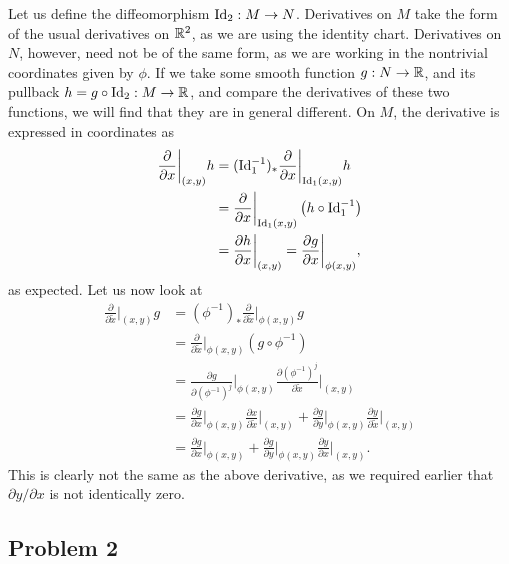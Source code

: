 \documentclass{../../mathnotes}
\begin{document}
Let us define the diffeomorphism $\operatorname{Id}_2:M\to N$. Derivatives on $M$ take the form of the usual derivatives on
$\mathbb{R}^2$, as we are using the identity chart. Derivatives on $N$, however, need not be of the same form, as we
are working in the nontrivial coordinates given by $\phi$. If we take some smooth function $g:N\to\mathbb{R}$, and its
pullback $h=g\circ\operatorname{Id}_2:M\to\mathbb{R}$, and compare the derivatives of these two functions, we will find that they are
in general different. On $M$, the derivative is expressed in coordinates as
\begin{align*}
    \frac{\partial}{\partial x}\bigg|_{(x,y)}h&=(\operatorname{Id}_1^{-1})_*\frac{\partial}{\partial x}\bigg|_{\operatorname{Id}_1(x,y)}h\\
    &=\frac{\partial}{\partial x}\bigg|_{\operatorname{Id}_1(x,y)}\left( h\circ \operatorname{Id}_1^{-1} \right)\\
    &=\frac{\partial h}{\partial x}\bigg|_{(x,y)}=\frac{\partial g}{\partial x}\bigg|_{\phi(x,y)},
\end{align*}
as expected. Let us now look at
\begin{align*}
    \frac{\partial}{\partial \tilde x}\bigg|_{(x,y)}g&=(\phi^{-1})_*\frac{\partial}{\partial \tilde x}\bigg|_{\phi(x,y)}g\\
    &=\frac{\partial}{\partial \tilde x}\bigg|_{\phi(x,y)}(g\circ\phi^{-1})\\
    &=\frac{\partial g}{\partial (\phi^{-1})^j}\bigg|_{\phi(x,y)}\frac{\partial (\phi^{-1})^j}{\partial \tilde x}\bigg|_{(x,y)}\\
    &=\frac{\partial g}{\partial x}\bigg|_{\phi(x,y)}\frac{\partial x}{\partial \tilde x}\bigg|_{(x,y)}
    +\frac{\partial g}{\partial y}\bigg|_{\phi(x,y)}\frac{\partial y}{\partial \tilde x}\bigg|_{(x,y)}\\
    &=\frac{\partial g}{\partial x}\bigg|_{\phi(x,y)}
    +\frac{\partial g}{\partial y}\bigg|_{\phi(x,y)}\frac{\partial y}{\partial x}\bigg|_{(x,y)}.
\end{align*}
This is clearly not the same as the above derivative, as we required earlier that $\partial y/\partial x$ is not identically
zero.

\subsection*{Problem 2}
\end{document}
